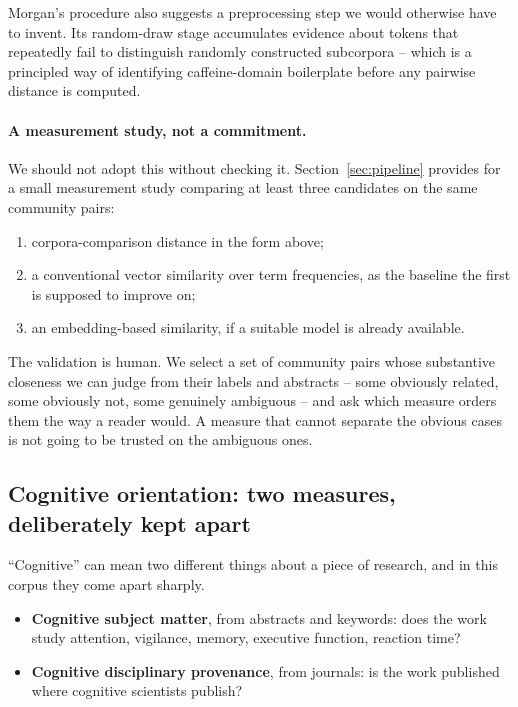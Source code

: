 \documentclass[11pt]{article}
\begin{document}
Morgan's procedure also suggests a preprocessing step we would otherwise have to invent.
Its random-draw stage accumulates evidence about tokens that repeatedly fail to distinguish
randomly constructed subcorpora -- which is a principled way of identifying caffeine-domain
boilerplate before any pairwise distance is computed.

\paragraph{A measurement study, not a commitment.}
We should not adopt this without checking it. Section~\ref{sec:pipeline} provides for a
small measurement study comparing at least three candidates on the same community pairs:

\begin{enumerate}[leftmargin=2em, itemsep=1pt]
  \item corpora-comparison distance in the form above;
  \item a conventional vector similarity over term frequencies, as the baseline the first
        is supposed to improve on;
  \item an embedding-based similarity, if a suitable model is already available.
\end{enumerate}

The validation is human. We select a set of community pairs whose substantive closeness we
can judge from their labels and abstracts -- some obviously related, some obviously not,
some genuinely ambiguous -- and ask which measure orders them the way a reader would. A
measure that cannot separate the obvious cases is not going to be trusted on the ambiguous
ones.

\subsection{Cognitive orientation: two measures, deliberately kept apart}

``Cognitive'' can mean two different things about a piece of research, and in this corpus
they come apart sharply.

\begin{itemize}[leftmargin=2em]
  \item \textbf{Cognitive subject matter}, from abstracts and keywords: does the work study
        attention, vigilance, memory, executive function, reaction time?
  \item \textbf{Cognitive disciplinary provenance}, from journals: is the work published
        where cognitive scientists publish?
\end{itemize}
\end{document}
